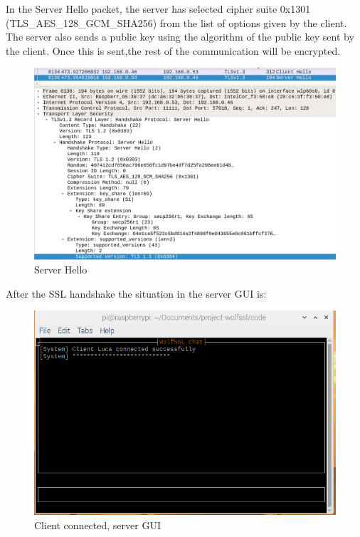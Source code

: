 \documentclass[a4paper,12pt]{report}
\begin{document}
In the Server Hello packet, the server has selected cipher suite 0x1301 (TLS\_AES\_128\_GCM\_SHA256) from the list of options given by the client.
\\The server also sends a public key using the algorithm of the public key sent by the client. Once this is sent,the rest of the communication will be encrypted.

\begin{figure}[H]
    \centering
    \includegraphics[scale=0.248]{./code/img/server-hello.png}
    \caption{Server Hello}
    
\end{figure}
\pagebreak

After the SSL handshake the situation in the server GUI is:
\begin{figure}[H]
    \centering
    \includegraphics[scale=0.6]{./code/img/2-server.png}
    \caption{Client connected, server GUI}
    
\end{figure}
\end{document}
